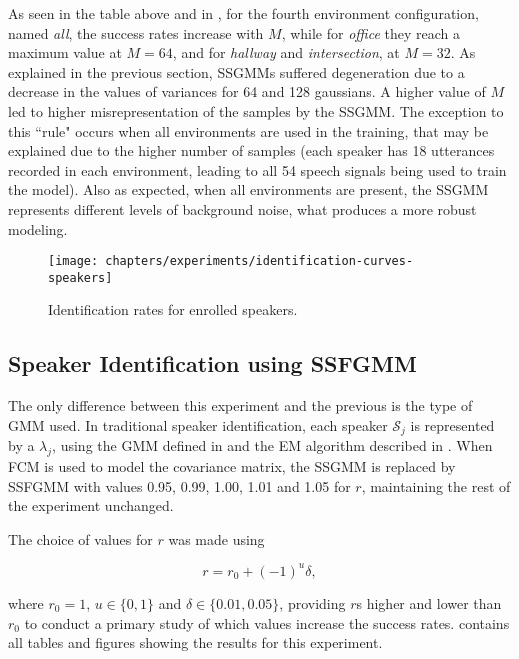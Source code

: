 As seen in the table above and in , for the fourth environment configuration, named \emph{all}, the success rates increase with $M$, while for \emph{office} they reach a maximum value at $M = 64$, and for \emph{hallway} and \emph{intersection}, at $M = 32$. As explained in the previous section, SSGMMs suffered degeneration due to a decrease in the values of variances for 64 and 128 gaussians. A higher value of $M$ led to higher misrepresentation of the samples by the SSGMM. The exception to this ``rule" occurs when all environments are used in the training, that may be explained due to the higher number of samples (each speaker has 18 utterances recorded in each environment, leading to all 54 speech signals being used to train the model). Also as expected, when all environments are present, the SSGMM represents different levels of background noise, what produces a more robust modeling.

\begin{figure}[ht]
    \centering
    \texttt{[image: chapters/experiments/identification-curves-speakers]}
    \caption{Identification rates for enrolled speakers.}
    \label{fig:identification-curves-speakers}
\end{figure}

\subsection{Speaker Identification using SSFGMM}

The only difference between this experiment and the previous is the type of GMM used. In traditional speaker identification, each speaker $\mathcal{S}_j$ is represented by a $\lambda_j$, using the GMM defined in  and the EM algorithm described in . When FCM is used to model the covariance matrix, the SSGMM is replaced by SSFGMM with values 0.95, 0.99, 1.00, 1.01 and 1.05 for $r$, maintaining the rest of the experiment unchanged.

The choice of values for $r$ was made using

\begin{equation}
    r = r_0 + (-1)^u\delta,
    \label{eq:choice-of-r}
\end{equation}

\noindent where $r_0 = 1$, $u \in \{0, 1\}$ and $\delta \in \{0.01, 0.05\}$, providing $r$s higher and lower than $r_0$ to conduct a primary study of which values increase the success rates.  contains all tables and figures showing the results for this experiment.

